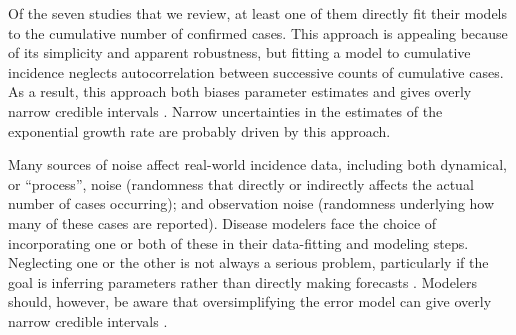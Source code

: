 \documentclass[12pt]{article}
\providecommand{\DIFaddtex}[1]{{\protect\color{blue}\uwave{#1}}} %
\providecommand{\DIFaddbegin}{} %
\providecommand{\DIFaddend}{} %
\providecommand{\DIFadd}[1]{\texorpdfstring{\DIFaddtex{#1}}{#1}} %
\newcommand{\DIFaddincludegraphics}[2][]{{\color{blue}\fbox{\DIFOincludegraphics[#1]{#2}}}} %
\DeclareRobustCommand{\DIFaddbegin}{\DIFOaddbegin \let\includegraphics\DIFaddincludegraphics} %
\DeclareRobustCommand{\DIFaddend}{\DIFOaddend \let\includegraphics\DIFOincludegraphics} %
\begin{document}
Of the seven studies that we review, at least one of them directly fit their models to the cumulative number of confirmed cases.
This approach is appealing because of its simplicity and apparent robustness, but fitting a model to cumulative incidence neglects autocorrelation between successive counts of cumulative cases. 
As a result, this approach both biases parameter estimates and gives overly narrow \DIFaddbegin \DIFadd{confidence/}\DIFaddend credible intervals \citep{ma2014estimating, king2015avoidable}.
Narrow uncertainties in the estimates of the exponential growth rate are probably driven by this approach.

Many sources of noise affect real-world incidence data, including both dynamical, or ``process'', noise (randomness that directly or indirectly affects the actual number of cases occurring); and observation noise (randomness underlying how many of these cases are reported).  
Disease modelers face the choice of incorporating one or both of these in their data-fitting and modeling steps. 
Neglecting one or the other is not always a serious problem, particularly if the goal is inferring parameters rather than directly making forecasts \citep{ma2014estimating}.
Modelers should, however, be aware that oversimplifying the error model can give overly narrow \DIFaddbegin \DIFadd{confidence/}\DIFaddend credible intervals \citep{king2015avoidable,taylor2016stochasticity}.
\end{document}
